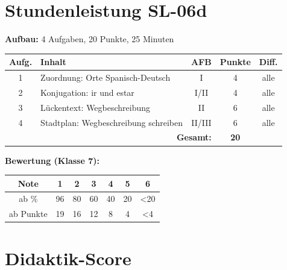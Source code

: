 \documentclass[11pt,a4paper]{article}
\begin{document}
\section{Stundenleistung SL-06d}

\textbf{Aufbau:} 4 Aufgaben, 20 Punkte, 25 Minuten

\begin{tabular}{|c|l|c|c|c|}
\hline
\textbf{Aufg.} & \textbf{Inhalt} & \textbf{AFB} & \textbf{Punkte} & \textbf{Diff.} \\
\hline
1 & Zuordnung: Orte Spanisch-Deutsch & I & 4 & alle \\
\hline
2 & Konjugation: ir und estar & I/II & 4 & alle \\
\hline
3 & Lückentext: Wegbeschreibung & II & 6 & alle \\
\hline
4 & Stadtplan: Wegbeschreibung schreiben & II/III & 6 & alle \\
\hline
\multicolumn{3}{|r|}{\textbf{Gesamt:}} & \textbf{20} & \\
\hline
\end{tabular}

\textbf{Bewertung (Klasse 7):}
\begin{tabular}{|c|c|c|c|c|c|c|}
\hline
Note & 1 & 2 & 3 & 4 & 5 & 6 \\
\hline
ab \% & 96 & 80 & 60 & 40 & 20 & <20 \\
\hline
ab Punkte & 19 & 16 & 12 & 8 & 4 & <4 \\
\hline
\end{tabular}

\newpage
\section{Didaktik-Score}
\end{document}
